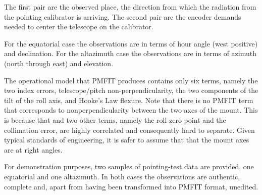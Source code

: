 \documentclass[11pt,fleqn,twoside,\paper]{article}
\renewcommand{\_}{{\tt\char'137}}     %
\begin{document}
The first pair are the observed place, the direction from which the
radiation from the pointing calibrator is arriving.
The second pair are the encoder demands needed to center the
telescope on the calibrator.

For the equatorial case the observations are in terms of hour angle
(west positive) and declination.  For the altazimuth case the
observations are in terms of azimuth (north through east) and
elevation.

The operational model that PMFIT produces
contains only six terms, namely the
two index errors, telescope/pitch non-perpendicularity,
the two components of the tilt of the roll axis, and Hooke's Law
flexure. Note that there is no PMFIT term that corresponds to
nonperpendicularity between the two axes of the mount.  This is
because that and two other terms, namely the roll
zero point and the collimation error, are highly correlated
and consequently hard to separate.  Given typical
standards of engineering, it is safer to assume that
that the mount axes are at right angles.

For demonstration purposes, two samples of
pointing-test data are provided, one equatorial and
one altazimuth.  In both cases the
observations are authentic, complete and, apart from having been
transformed into PMFIT format, unedited.
\end{document}
